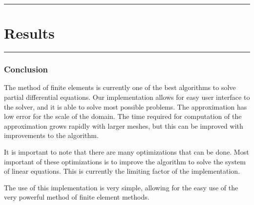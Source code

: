 \documentclass[10pt]{armath}
\numberwithin{equation}{section}
\theoremstyle{definition}
\newcommand{\hdiv}[3]{
  \vspace{#1}%
  \noindent\rule{\textwidth}{#2}%
  \vspace{#3}%
}
\begin{document}
\newpage
\hdiv{10pt}{0.5pt}{1pt}
\part{Results}%
\label{prt:results}
\hdiv{1pt}{0.5pt}{10pt}




\section{Conclusion}%
\label{sec:conclusion}

The method of finite elements is currently one of the best algorithms to solve
partial differential equations. Our implementation allows for easy user
interface to the solver, and it is able to solve most possible problems. The
approximation has low error for the scale of the domain. The time required for
computation of the approximation grows rapidly with larger meshes, but this
can be improved with improvements to the algorithm.

It is important to note that there are many optimizations that can be done.
Most important of these optimizations is to improve the algorithm to solve the
system of linear equations. This is currently the limiting factor of the
implementation.

The use of this implementation is very simple, allowing for the easy use of the
very powerful method of finite element methods.

\newpage
\nocite{*}



\newpage

\end{document}
